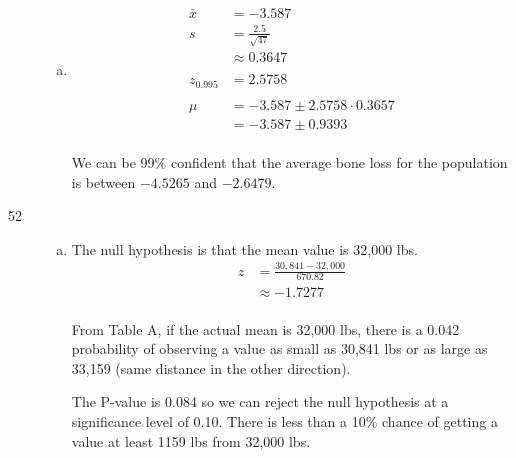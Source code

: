 \documentclass[letterpaper, landscape]{exam}
\begin{document}
\begin{description}
\begin{enumerate}[(a)]
          \item
            \begin{align*}
              \bar{x} & = -3.587 \\
              s       & = \frac{2.5}{\sqrt{47}} \\
                      & \approx 0.3647 \\
              \\
              z_{0.995} & = 2.5758 \\
              \\
              \mu & = -3.587 \pm 2.5758 \cdot 0.3657 \\
                  & = -3.587 \pm 0.9393 \\
            \end{align*}

            We can be 99\% confident that the average bone loss for the
            population is between $-4.5265$ and $-2.6479$.

        \end{enumerate}

      \item[52]
        \begin{enumerate}[(a)]
          From exercise 50:
          \begin{align*}
            \bar{x}          & = 30,841 \\
            \sigma_{\bar{x}} & \approx 670.82 \\
          \end{align*}

          \item 
            The null hypothesis is that the mean value is 32,000 lbs.
            \begin{align*}
              z & = \frac{30,841 - 32,000}{670.82} \\
                & \approx -1.7277 \\
            \end{align*}

            From Table A, if the actual mean is 32,000 lbs, there is a 0.042
            probability of observing a value as small as 30,841 lbs or as large
            as 33,159 (same distance in the other direction).

            The P-value is 0.084 so we can reject the null hypothesis at a
            significance level of 0.10. There is less than a 10\% chance of
            getting a value at least 1159 lbs from 32,000 lbs.


\end{enumerate}
\end{description}
\end{document}
